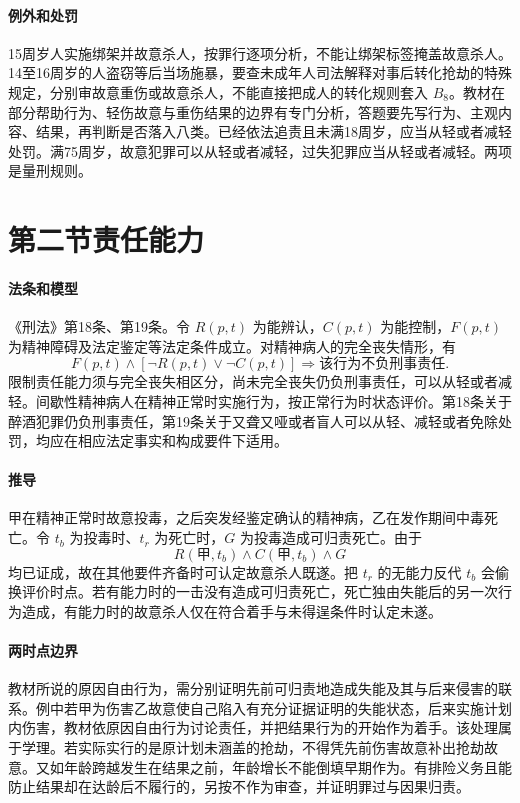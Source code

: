 \paragraph{例外和处罚}
15周岁人实施绑架并故意杀人，按罪行逐项分析，不能让绑架标签掩盖故意杀人。14至16周岁的人盗窃等后当场施暴，要查未成年人司法解释对事后转化抢劫的特殊规定，分别审故意重伤或故意杀人，不能直接把成人的转化规则套入 \(B_8\)。教材在部分帮助行为、轻伤故意与重伤结果的边界有专门分析，答题要先写行为、主观内容、结果，再判断是否落入八类。已经依法追责且未满18周岁，应当从轻或者减轻处罚。满75周岁，故意犯罪可以从轻或者减轻，过失犯罪应当从轻或者减轻。两项是量刑规则。

\section{第二节\quad 责任能力}

\paragraph{法条和模型}
《刑法》第18条、第19条。令 \(R(p,t)\) 为能辨认，\(C(p,t)\) 为能控制，\(F(p,t)\) 为精神障碍及法定鉴定等法定条件成立。对精神病人的完全丧失情形，有
\[
F(p,t)\land[\neg R(p,t)\lor\neg C(p,t)]
\Longrightarrow \text{该行为不负刑事责任}.
\]
限制责任能力须与完全丧失相区分，尚未完全丧失仍负刑事责任，可以从轻或者减轻。间歇性精神病人在精神正常时实施行为，按正常行为时状态评价。第18条关于醉酒犯罪仍负刑事责任，第19条关于又聋又哑或者盲人可以从轻、减轻或者免除处罚，均应在相应法定事实和构成要件下适用。

\paragraph{推导}
甲在精神正常时故意投毒，之后突发经鉴定确认的精神病，乙在发作期间中毒死亡。令 \(t_b\) 为投毒时、\(t_r\) 为死亡时，\(G\) 为投毒造成可归责死亡。由于
\[
R(\text{甲},t_b)\land C(\text{甲},t_b)\land G
\]
均已证成，故在其他要件齐备时可认定故意杀人既遂。把 \(t_r\) 的无能力反代 \(t_b\) 会偷换评价时点。若有能力时的一击没有造成可归责死亡，死亡独由失能后的另一次行为造成，有能力时的故意杀人仅在符合着手与未得逞条件时认定未遂。

\paragraph{两时点边界}
教材所说的原因自由行为，需分别证明先前可归责地造成失能及其与后来侵害的联系。例中若甲为伤害乙故意使自己陷入有充分证据证明的失能状态，后来实施计划内伤害，教材依原因自由行为讨论责任，并把结果行为的开始作为着手。该处理属于学理。若实际实行的是原计划未涵盖的抢劫，不得凭先前伤害故意补出抢劫故意。又如年龄跨越发生在结果之前，年龄增长不能倒填早期作为。有排险义务且能防止结果却在达龄后不履行的，另按不作为审查，并证明罪过与因果归责。

